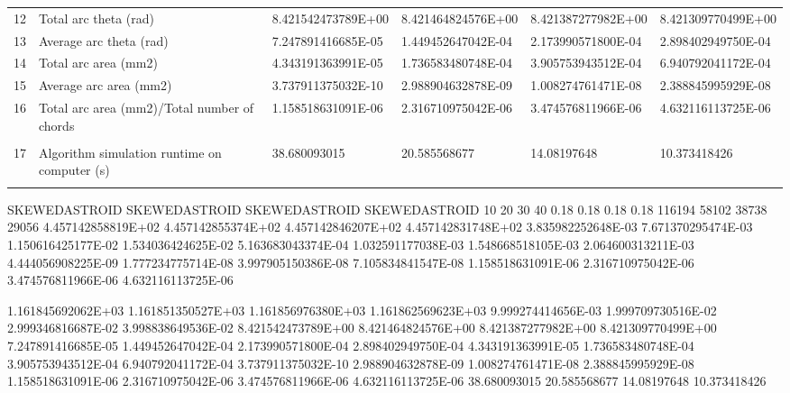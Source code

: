 \begin{tabular}{ p{0.5cm} p{8.0cm} p{4.00cm} p{4.0cm} p{4.00cm} p{4.0cm}}
12	& Total arc theta (rad)	                               & 8.421542473789E+00	& 8.421464824576E+00   & 8.421387277982E+00	& 8.421309770499E+00 \\
13	& Average arc theta (rad)	                           & 7.247891416685E-05	& 1.449452647042E-04   & 2.173990571800E-04	& 2.898402949750E-04 \\
14	& Total arc area (mm2)	                               & 4.343191363991E-05	& 1.736583480748E-04   & 3.905753943512E-04	& 6.940792041172E-04 \\	
15	& Average arc area (mm2)	                           & 3.737911375032E-10	& 2.988904632878E-09   & 1.008274761471E-08	& 2.388845995929E-08 \\
16	& Total arc area (mm2)/Total number of chords	       & 1.158518631091E-06	& 2.316710975042E-06   & 3.474576811966E-06	& 4.632116113725E-06 \\
	&                                                      &                    &                      &                    & \\
17	& Algorithm simulation runtime on computer (s)         & 38.680093015	    & 20.585568677	       & 14.08197648	    & 10.373418426\\
	&                                                      &                    &                      &                    & 
\end{tabular}



SKEWEDASTROID	SKEWEDASTROID	SKEWEDASTROID	SKEWEDASTROID
10	20	30	40
0.18	0.18	0.18	0.18
116194	58102	38738	29056
4.457142858819E+02	4.457142855374E+02	4.457142846207E+02	4.457142831748E+02
3.835982252648E-03	7.671370295474E-03	1.150616425177E-02	1.534036424625E-02
5.163683043374E-04	1.032591177038E-03	1.548668518105E-03	2.064600313211E-03
4.444056908225E-09	1.777234775714E-08	3.997905150386E-08	7.105834841547E-08
1.158518631091E-06	2.316710975042E-06	3.474576811966E-06	4.632116113725E-06


1.161845692062E+03	1.161851350527E+03	1.161856976380E+03	1.161862569623E+03
9.999274414656E-03	1.999709730516E-02	2.999346816687E-02	3.998838649536E-02
8.421542473789E+00	8.421464824576E+00	8.421387277982E+00	8.421309770499E+00
7.247891416685E-05	1.449452647042E-04	2.173990571800E-04	2.898402949750E-04
4.343191363991E-05	1.736583480748E-04	3.905753943512E-04	6.940792041172E-04
3.737911375032E-10	2.988904632878E-09	1.008274761471E-08	2.388845995929E-08
1.158518631091E-06	2.316710975042E-06	3.474576811966E-06	4.632116113725E-06
38.680093015	20.585568677	14.08197648	10.373418426



